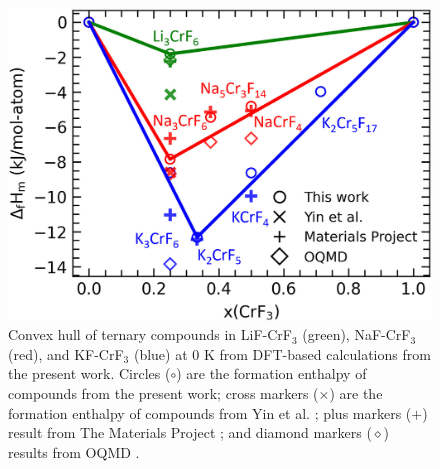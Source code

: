 \begin{figure}[H]
    \centering
    \includegraphics[width=0.5\linewidth]{moltensalts/Moltensalts-FLiNaKCr-DFTHf.jpg}
    \caption{Convex hull of ternary compounds in LiF-CrF$_3$ (green), NaF-CrF$_3$ (red), and KF-CrF$_3$ (blue) at 0 K from DFT-based calculations from the present work. Circles ($\circ$) are the formation enthalpy of compounds from the present work; cross markers ($\times$) are the formation enthalpy of compounds from Yin et al. \cite{yin2018thermodynamic, yin2014thermodynamic}; plus markers ($+$) result from The Materials Project \cite{jain2013commentary}; and diamond markers ($\diamond$) results from OQMD \cite{kirklin2015open}. }
    \label{ms:fig:FLiNaKCr-Hf}
\end{figure}

